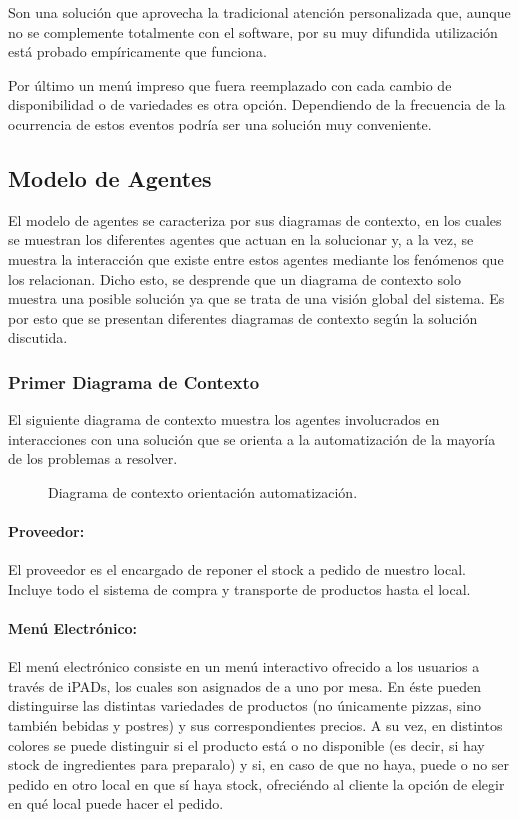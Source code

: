 \documentclass[a4paper,10pt]{article}
\begin{document}
Son una solución que aprovecha la tradicional atención personalizada que, aunque no se complemente totalmente con el software, por su muy difundida utilización está probado empíricamente que funciona.

Por último un menú impreso que fuera reemplazado con cada cambio de disponibilidad o de variedades es otra opción. Dependiendo de la frecuencia de la ocurrencia de estos eventos podría ser una solución muy conveniente. 

\bigskip

\subsection*{Modelo de Agentes}

El modelo de agentes se caracteriza por sus diagramas de contexto, en los cuales se muestran los diferentes agentes que actuan en la solucionar y,
a la vez, se muestra la interacci\'on que existe entre estos agentes mediante los fen\'omenos que los relacionan. Dicho esto, se desprende que un
diagrama de contexto solo muestra una posible soluci\'on ya que se trata de una visi\'on global del sistema. Es por esto que se presentan diferentes
diagramas de contexto seg\'un la soluci\'on discutida.

\subsubsection*{Primer Diagrama de Contexto}
El siguiente diagrama de contexto muestra los agentes involucrados en interacciones con una solución que se orienta a la automatización de la 
mayor\'ia de los problemas a resolver.

\begin{figure}[H]
\centering
{}
\caption{Diagrama de contexto orientación automatización.}
\end{figure}

\paragraph{Proveedor:}
El proveedor es el encargado de reponer el stock a pedido de nuestro local. Incluye todo el sistema de compra y transporte de productos hasta el local.
\\
\paragraph{Menú Electrónico:}
El menú electrónico consiste en un menú interactivo ofrecido a los usuarios a través de iPADs, los cuales son asignados de a uno por mesa. En éste pueden distinguirse las distintas variedades de productos (no únicamente pizzas, sino también bebidas y postres) y sus correspondientes precios. A su vez, en distintos colores se puede distinguir si el producto está o no disponible (es decir, si hay stock de ingredientes para preparalo) y si, en caso de que no haya, puede o no ser pedido en otro local en que sí haya stock, ofreciéndo al cliente la opción de elegir en qué local puede hacer el pedido.
\\
\end{document}
